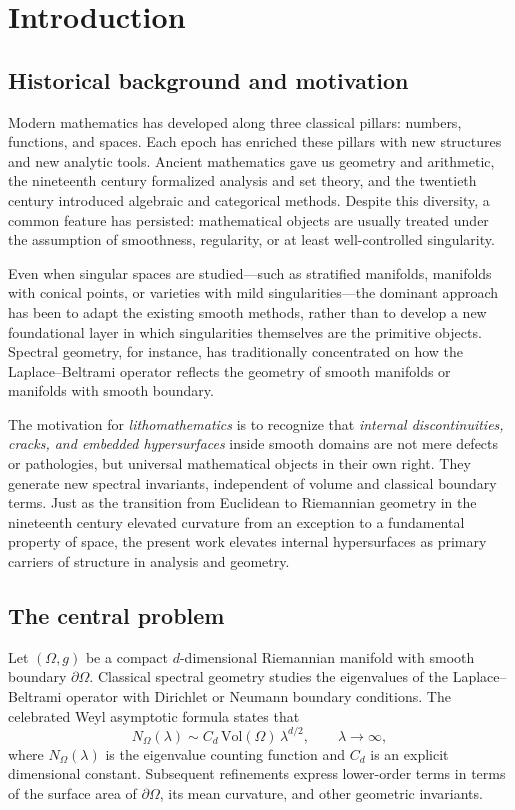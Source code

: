 \section{Introduction}

\subsection{Historical background and motivation}

Modern mathematics has developed along three classical pillars: numbers, functions, and spaces. 
Each epoch has enriched these pillars with new structures and new analytic tools. 
Ancient mathematics gave us geometry and arithmetic, the nineteenth century formalized analysis and set theory, 
and the twentieth century introduced algebraic and categorical methods. 
Despite this diversity, a common feature has persisted: 
mathematical objects are usually treated under the assumption of smoothness, regularity, or at least well-controlled singularity. 

Even when singular spaces are studied---such as stratified manifolds, manifolds with conical points, or varieties with mild singularities---the dominant approach has been to adapt the existing smooth methods, 
rather than to develop a new foundational layer in which singularities themselves are the primitive objects. 
Spectral geometry, for instance, has traditionally concentrated on how the Laplace--Beltrami operator 
reflects the geometry of smooth manifolds or manifolds with smooth boundary. 

The motivation for \emph{lithomathematics} is to recognize that 
\emph{internal discontinuities, cracks, and embedded hypersurfaces} inside smooth domains 
are not mere defects or pathologies, 
but universal mathematical objects in their own right. 
They generate new spectral invariants, independent of volume and classical boundary terms. 
Just as the transition from Euclidean to Riemannian geometry in the nineteenth century 
elevated curvature from an exception to a fundamental property of space, 
the present work elevates internal hypersurfaces as primary carriers of structure in analysis and geometry. 

\subsection{The central problem}

Let $(\Omega,g)$ be a compact $d$-dimensional Riemannian manifold with smooth boundary $\partial \Omega$. 
Classical spectral geometry studies the eigenvalues of the Laplace--Beltrami operator 
with Dirichlet or Neumann boundary conditions. 
The celebrated Weyl asymptotic formula states that
\begin{equation}\label{eq:weyl}
  N_\Omega(\lambda) \sim C_d \, \mathrm{Vol}(\Omega) \, \lambda^{d/2}, 
  \qquad \lambda \to \infty,
\end{equation}
where $N_\Omega(\lambda)$ is the eigenvalue counting function and $C_d$ is an explicit dimensional constant. 
Subsequent refinements express lower-order terms in terms of the surface area of $\partial\Omega$, 
its mean curvature, and other geometric invariants.

